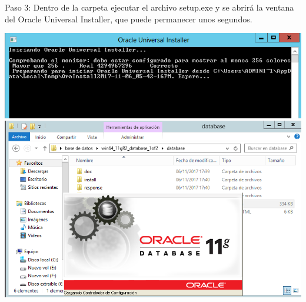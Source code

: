 \documentclass[a4paper,openright,12pt]{book}
\begin{document}
Paso 3: Dentro de la carpeta ejecutar el archivo setup.exe y se abrirá la ventana del  Oracle Universal Installer, que puede permanecer unos segundos.\\ 
\begin{center}
\includegraphics[width=15cm]{./windows server/4.png}
\includegraphics[width=15cm]{./windows server/5.png}
\end{center}
\end{document}

